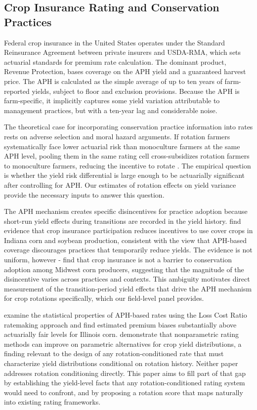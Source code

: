 \documentclass[12pt,letterpaper]{article}
\theoremstyle{remark}
\theoremstyle{remark}
\theoremstyle{plain}
\theoremstyle{definition}
\begin{document}
\subsection{\label{subsec:insurance_rating} Crop Insurance Rating and Conservation Practices}

Federal crop insurance in the United States operates under the Standard Reinsurance Agreement between private insurers and USDA-RMA, which sets actuarial standards for premium rate calculation. The dominant product, Revenue Protection, bases coverage on the APH yield and a guaranteed harvest price. The APH is calculated as the simple average of up to ten years of farm-reported yields, subject to floor and exclusion provisions. Because the APH is farm-specific, it implicitly captures some yield variation attributable to management practices, but with a ten-year lag and considerable noise.

The theoretical case for incorporating conservation practice information into rates rests on adverse selection and moral hazard arguments. If rotation farmers systematically face lower actuarial risk than monoculture farmers at the same APH level, pooling them in the same rating cell cross-subsidizes rotation farmers to monoculture farmers, reducing the incentive to rotate \citep{Ramaswami1993, Babcock1996}. The empirical question is whether the yield risk differential is large enough to be actuarially significant after controlling for APH. Our estimates of rotation effects on yield variance provide the necessary inputs to answer this question.

The APH mechanism creates specific disincentives for practice adoption because short-run yield effects during transitions are recorded in the yield history. \cite{Connor2022} find evidence that crop insurance participation reduces incentives to use cover crops in Indiana corn and soybean production, consistent with the view that APH-based coverage discourages practices that temporarily reduce yields. The evidence is not uniform, however - \cite{Fleckenstein2020} find that crop insurance is not a barrier to conservation adoption among Midwest corn producers, suggesting that the magnitude of the disincentive varies across practices and contexts. This ambiguity motivates direct measurement of the transition-period yield effects that drive the APH mechanism for crop rotations specifically, which our field-level panel provides.

\cite{Woodard2011} examine the statistical properties of APH-based rates using the Loss Cost Ratio ratemaking approach and find estimated premium biases substantially above actuarially fair levels for Illinois corn. \cite{Ker2000} demonstrate that nonparametric rating methods can improve on parametric alternatives for crop yield distributions, a finding relevant to the design of any rotation-conditioned rate that must characterize yield distributions conditional on rotation history. Neither paper addresses rotation conditioning directly. This paper aims to fill part of that gap by establishing the yield-level facts that any rotation-conditioned rating system would need to confront, and by proposing a rotation score that maps naturally into existing rating frameworks.
\end{document}
